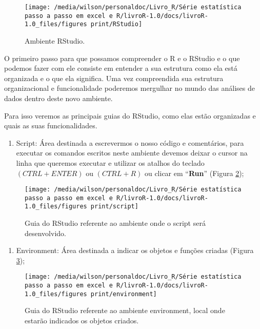 \documentclass[titlepage, oneside, openany, a4paper]{book}
\providecommand{\tightlist}{%
  \setlength{\itemsep}{0pt}\setlength{\parskip}{0pt}}
\begin{document}
\begin{figure}

{\centering \texttt{[image: /media/wilson/personaldoc/Livro\_R/Série estatística passo a passo em excel e R/livroR-1.0/docs/livroR-1.0\_files/figures print/RStudio]} 

}

\caption{Ambiente RStudio.}\label{fig:RStudio}
\end{figure}

O primeiro passo para que possamos compreender o R e o RStudio e o que podemos fazer com ele consiste em entender a sua estrutura como ela está organizada e o que ela significa. Uma vez compreendida sua estrutura organizacional e funcionalidade poderemos mergulhar no mundo das análises de dados dentro deste novo ambiente.

Para isso veremos as principais guias do RStudio, como elas estão organizadas e quais as suas funcionalidades.

\begin{enumerate}
\def\labelenumi{\arabic{enumi}.}
\tightlist
\item
  Script: Área destinada a escrevermos o nosso código e comentários, para executar os comandos escritos neste ambiente devemos deixar o cursor na linha que queremos executar e utilizar os atalhos do teclado \((CTRL + ENTER)\) ou \((CTRL + R)\) ou clicar em ``\textbf{Run}'' (Figura \ref{fig:script});
\end{enumerate}

\begin{figure}

{\centering \texttt{[image: /media/wilson/personaldoc/Livro\_R/Série estatística passo a passo em excel e R/livroR-1.0/docs/livroR-1.0\_files/figures print/script]} 

}

\caption{Guia do RStudio referente ao ambiente onde o script será desenvolvido.}\label{fig:script}
\end{figure}

\begin{enumerate}
\def\labelenumi{\arabic{enumi}.}
\setcounter{enumi}{1}
\tightlist
\item
  Environment: Área destinada a indicar os objetos e funções criadas (Figura \ref{fig:environment});
\end{enumerate}

\begin{figure}

{\centering \texttt{[image: /media/wilson/personaldoc/Livro\_R/Série estatística passo a passo em excel e R/livroR-1.0/docs/livroR-1.0\_files/figures print/environment]} 

}

\caption{Guia do RStudio referente ao ambiente environment, local onde estarão indicados os objetos criados.}\label{fig:environment}
\end{figure}
\end{document}
